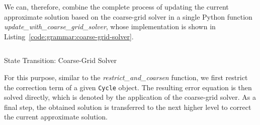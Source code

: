We can, therefore, combine the complete process of updating the current approximate solution based on the coarse-grid solver in a single Python function \emph{update\_with\_coarse\_grid\_solver}, whose implementation is shown in Listing~\ref{code:grammar:coarse-grid-solver}.
\begin{listing}
	\inputminted{python}{evostencils/grammar/coarse_grid_solver.py}
	\caption{State Transition: Coarse-Grid Solver}
	\label{code:grammar:coarse-grid-solver}
\end{listing}
For this purpose, similar to the \emph{restrict\_and\_coarsen} function, we first restrict the correction term of a given \texttt{Cycle} object.
The resulting error equation is then solved directly, which is denoted by the application of the coarse-grid solver.
As a final step, the obtained solution is transferred to the next higher level to correct the current approximate solution.
